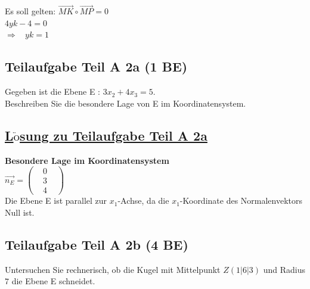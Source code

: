 \documentclass[a4 paper, 12pt]{report}
\theoremstyle{plain}
\begin{document}
Es soll gelten: $\stackrel{\longrightarrow}{MK}\circ \stackrel{\longrightarrow}{MP} = 0$\\
$4yk-4 = 0$\\
$\Longrightarrow~~~~yk = 1$

\subsection*{Teilaufgabe Teil A 2a (1 BE)}
Gegeben ist die Ebene E : $3x_2+4x_3 = 5$.\\
Beschreiben Sie die besondere Lage von E im Koordinatensystem.
\subsection*{\underline{L$\ddot{\mbox{o}}$sung zu Teilaufgabe Teil A 2a}}
\textbf{\large Besondere Lage im Koordinatensystem}\\
$\stackrel{\longrightarrow}{n_E} = 
\begin{pmatrix}
&0&\\
&3&\\
&4&
\end{pmatrix}
$\\
Die Ebene E ist parallel zur $x_1$-Achse, da die $x_1$-Koordinate des Normalenvektors Null ist.
\subsection*{Teilaufgabe Teil A 2b (4 BE)}
Untersuchen Sie rechnerisch, ob die Kugel mit Mittelpunkt $Z(1|6|3)$ und Radius $7$ die
Ebene E schneidet.
\newpage
\end{document}
